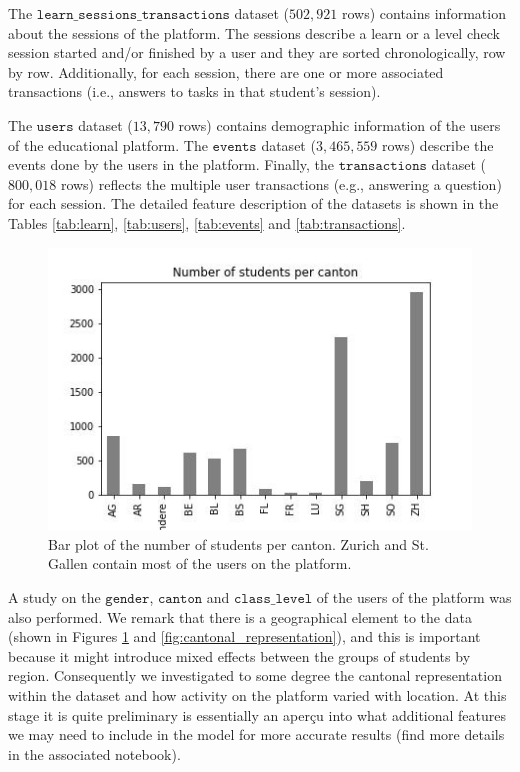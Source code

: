 \documentclass[sigplan,screen]{acmart}
\begin{document}
The $\texttt{learn\_sessions\_transactions}$ dataset ($502,921$ rows) contains information about the sessions of the platform. The sessions describe a learn or a level check session started and/or finished by a user and they are sorted chronologically, row by row. Additionally, for each session, there are one or more associated transactions (i.e., answers to tasks in that student's session).

The $\texttt{users}$ dataset ($13,790$ rows) contains demographic information of the users of the educational platform. The $\texttt{events}$ dataset ($3,465,559$ rows) describe the events done by the users in the platform. Finally, the $\texttt{transactions}$ dataset ($800,018$ rows) reflects the multiple user transactions (e.g., answering a question) for each session. The detailed feature description of the datasets is shown in the Tables \ref{tab:learn}, \ref{tab:users}, \ref{tab:events} and \ref{tab:transactions}.

\begin{figure}[h]
    \centering
    \includegraphics[width=\linewidth]{reports/figures/num_per_canton.jpg}
    \caption{Bar plot of the number of students per canton. Zurich and St. Gallen contain most of the users on the platform.}
    \label{fig:my_label}
\end{figure}

A study on the $\texttt{gender}$, $\texttt{canton}$ and $\texttt{class\_level}$ of the users of the platform was also performed. We remark that there is a geographical element to the data (shown in Figures \ref{fig:my_label} and \ref{fig:cantonal_representation}), and this is important because it might introduce mixed effects between the groups of students by region. Consequently we investigated to some degree the cantonal representation within the dataset and how activity on the platform varied with location. At this stage it is quite preliminary is essentially an aperçu into what additional features we may need to include in the model for more accurate results (find more details in the associated notebook).
\end{document}
